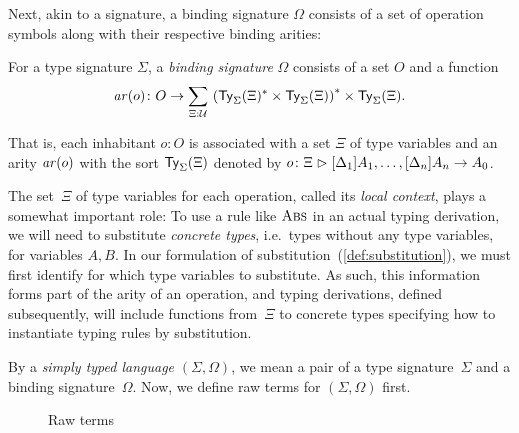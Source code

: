 Next, akin to a signature, a binding signature $\Omega$ consists of a set of operation symbols along with their respective binding arities:
\begin{definition}\label{def:binding-signature}
  For a type signature $\Sigma$, a \emph{binding signature} $\Omega$ consists of a set $O$ and a function
  \[
    \arity(o) \colon O \to \sm{\Xi : \UU} \left(\Type_\Sigma(\Xi)^* \times \Type_\Sigma(\Xi)\right)^* \times \Type_\Sigma(\Xi).
  \]
\end{definition}
That is, each inhabitant $o: O$  is associated with a set $\Xi$ of type variables and an arity $\mathit{ar}(o)$ with the sort $\mathsf{Ty}_{\Sigma}(\Xi)$ denoted by $o\colon \Xi \mathrel{\rhd} [\Delta_{1}]A_{1}, \ldots, [\Delta_{n}]A_{n} \to A_0$.

The set~$\Xi$ of type variables for each operation, called its \emph{local context}, plays a somewhat important role:
To use a rule like $\textnormal{\textsc{Abs}}$ in an actual typing derivation, we will need to substitute \emph{concrete types}, i.e.\ types without any type variables, for variables $A, B$.
In our formulation of substitution~(\cref{def:substitution}), we must first identify for which type variables to substitute.
As such, this information forms part of the arity of an operation, and typing derivations, defined subsequently, will include functions from~$\Xi$ to concrete types specifying how to instantiate typing rules by substitution.

By a \emph{simply typed language} $(\Sigma, \Omega)$, we mean a pair of a type signature~$\Sigma$ and a binding signature~$\Omega$.
Now, we define raw terms for $(\Sigma, \Omega)$ first.

\begin{figure}
  \centering
  \small
  \caption{Raw terms}
  \label{fig:raw-terms}
\end{figure}


